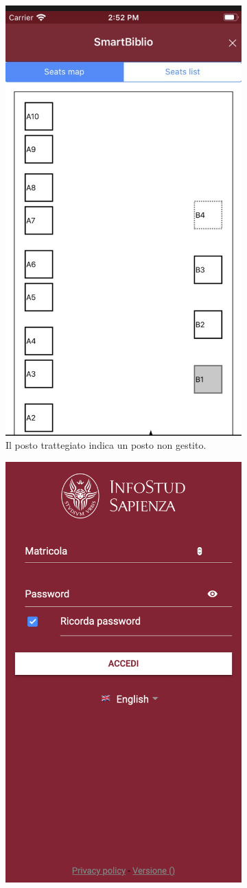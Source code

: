\documentclass[Lau, oneside, noexaminfo]{sapthesis}%
\begin{document}
\begin{figure}[H]
	\begin{subfigure}{0.6\textwidth}
		\centering
		\includegraphics[width=0.5\linewidth]{issues/sb-l}  
		\caption{Il posto trattegiato indica un posto non gestito.}
	\end{subfigure}
	\begin{subfigure}{0.6\textwidth}
		\centering
		\includegraphics[width=0.5\linewidth]{issues/password}  

\end{subfigure}
\end{figure}
\end{document}

